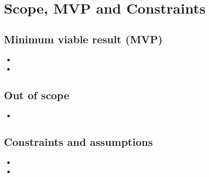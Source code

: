 \chapter{Scope, MVP and Constraints}
\label{ch:scope}

\section{Minimum viable result (MVP)}
\begin{itemize}
  \item {}
  \item {}
\end{itemize}

\section{Out of scope}
\begin{itemize}
  \item {}
\end{itemize}

\section{Constraints and assumptions}
\begin{itemize}
  \item {}
  \item {}
\end{itemize}
